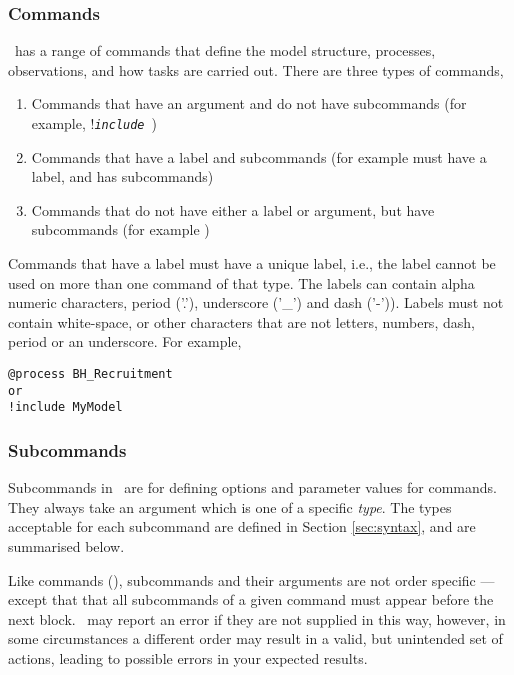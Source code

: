 \subsubsection{Commands}

\CNAME\ has a range of commands that define the model structure, processes, observations, and how tasks are carried out. There are three types of commands, 

\begin{enumerate}
\item Commands that have an argument and do not have subcommands (for example, !\texttt{\emph{include}}\ )
\item Commands that have a label and subcommands (for example  must have a label, and has subcommands)
\item Commands that do not have either a label or argument, but have subcommands (for example )
\end{enumerate}

Commands that have a label must have a unique label, i.e., the label cannot be used on more than one command of that type. The labels can contain alpha numeric characters, period ('.'), underscore ('\_') and dash ('-')). Labels must not contain white-space, or other characters that are not letters, numbers, dash, period or an underscore. For example,

{\small{\begin{verbatim}
@process BH_Recruitment
or
!include MyModel
		\end{verbatim}}}

\subsubsection{Subcommands}

Subcommands in \CNAME\ are for defining options and parameter values for commands. They always take an argument which is one of a specific \emph{type}. The types acceptable for each subcommand are defined in Section \ref{sec:syntax}, and are summarised below. 

Like commands (), subcommands and their arguments are not order specific --- except that that all subcommands of a given command must appear before the next  block. \CNAME\ may report an error if they are not supplied in this way, however, in some circumstances a different order may result in a valid, but unintended set of actions, leading to possible errors in your expected results.  

